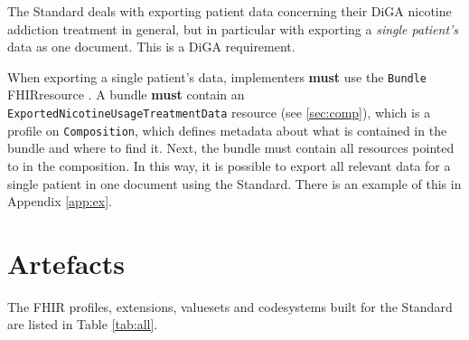 \documentclass[12px]{report}
\def\code#1{\texttt{#1}} %
\newcommand{\fhir}{FHIR\textsuperscript{\textregistered}}
\begin{document}
The Standard deals with exporting patient data concerning their DiGA nicotine addiction treatment in general,
but in particular with exporting a \textit{single patient's} data as one document. This is a DiGA requirement.

When exporting a single patient's data, implementers \textbf{must} use the \code{Bundle} \fhir resource \cite{bundle}. A bundle \textbf{must} contain an \code{ExportedNicotineUsageTreatmentData} resource (see \ref{sec:comp}), which is a profile on \code{Composition},
which defines metadata about what is contained in the bundle and where to find it. Next, the bundle must contain all resources pointed to in the composition. In this way, it is possible
to export all relevant data for a single patient in one document using the Standard. There is an example of this in Appendix \ref{app:ex}.

\section{Artefacts}
The FHIR profiles, extensions, valuesets and codesystems built for the Standard are listed in Table \ref{tab:all}.
\end{document}
